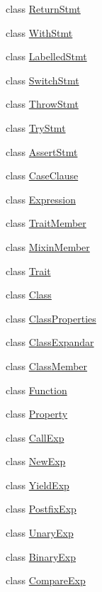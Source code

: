 \begin{DoxyCompactItemize}
\item 
class \hyperlink{classmocha_1_1_return_stmt}{ReturnStmt}
\item 
class \hyperlink{classmocha_1_1_with_stmt}{WithStmt}
\item 
class \hyperlink{classmocha_1_1_labelled_stmt}{LabelledStmt}
\item 
class \hyperlink{classmocha_1_1_switch_stmt}{SwitchStmt}
\item 
class \hyperlink{classmocha_1_1_throw_stmt}{ThrowStmt}
\item 
class \hyperlink{classmocha_1_1_try_stmt}{TryStmt}
\item 
class \hyperlink{classmocha_1_1_assert_stmt}{AssertStmt}
\item 
class \hyperlink{classmocha_1_1_case_clause}{CaseClause}
\item 
class \hyperlink{classmocha_1_1_expression}{Expression}
\item 
class \hyperlink{classmocha_1_1_trait_member}{TraitMember}
\item 
class \hyperlink{classmocha_1_1_mixin_member}{MixinMember}
\item 
class \hyperlink{classmocha_1_1_trait}{Trait}
\item 
class \hyperlink{classmocha_1_1_class}{Class}
\item 
class \hyperlink{classmocha_1_1_class_properties}{ClassProperties}
\item 
class \hyperlink{classmocha_1_1_class_expandar}{ClassExpandar}
\item 
class \hyperlink{classmocha_1_1_class_member}{ClassMember}
\item 
class \hyperlink{classmocha_1_1_function}{Function}
\item 
class \hyperlink{classmocha_1_1_property}{Property}
\item 
class \hyperlink{classmocha_1_1_call_exp}{CallExp}
\item 
class \hyperlink{classmocha_1_1_new_exp}{NewExp}
\item 
class \hyperlink{classmocha_1_1_yield_exp}{YieldExp}
\item 
class \hyperlink{classmocha_1_1_postfix_exp}{PostfixExp}
\item 
class \hyperlink{classmocha_1_1_unary_exp}{UnaryExp}
\item 
class \hyperlink{classmocha_1_1_binary_exp}{BinaryExp}
\item 
class \hyperlink{classmocha_1_1_compare_exp}{CompareExp}
\item 

\end{DoxyCompactItemize}
